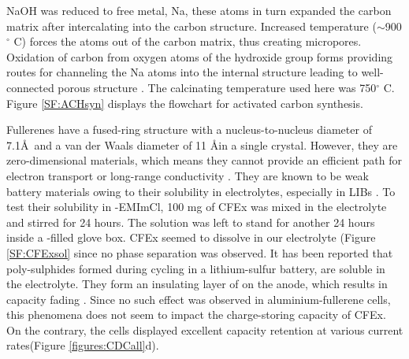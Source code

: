 \documentclass{article}
\begin{document}
NaOH was reduced to free metal, Na, these atoms in turn expanded the carbon matrix after intercalating into the carbon structure. Increased temperature ($\sim$900$^{\circ}$ C) forces the  atoms out of the carbon matrix, thus creating micropores. Oxidation of carbon from oxygen atoms of the hydroxide group forms  providing routes for channeling the Na atoms into the internal structure leading to well-connected porous structure \cite{satish}. The calcinating temperature used here was 750$^{\circ}$ C. Figure \ref{SF:ACHsyn} displays the flowchart for activated carbon synthesis. 




Fullerenes have a fused-ring structure with a nucleus-to-nucleus diameter of 7.1\AA\ and a van der Waals diameter of 11 \AA in a single crystal. However, they are zero-dimensional materials, which means they cannot provide an efficient path for electron transport or long-range conductivity \cite{loutfy_fullerene_2002, winkler_two-component_2007}. They are known to be weak battery materials owing to their solubility in electrolytes, especially in LIBs \cite{seger_prospects_1991}. To test their solubility in -EMImCl, 100 mg of CFEx was mixed in the electrolyte and stirred for 24 hours. The solution was left to stand for another 24 hours inside a -filled glove box. CFEx seemed to dissolve in our electrolyte (Figure \ref{SF:CFExsol} since no phase separation was observed. It has been reported that poly-sulphides formed during cycling in a lithium-sulfur battery, are soluble in the electrolyte. They form an insulating layer of  on the anode, which results in capacity fading \cite{sun_effect_2017}. Since no such effect was observed in aluminium-fullerene cells, this phenomena does not seem to impact the charge-storing capacity of CFEx. On the contrary, the cells displayed excellent capacity retention at various current rates(Figure \ref{figures:CDCall}d).   
\end{document}
